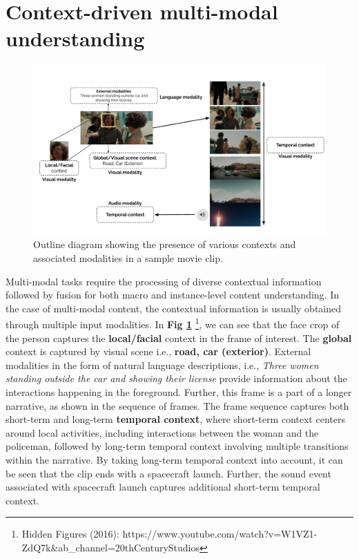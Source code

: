 \section{Context-driven multi-modal understanding}
\begin{figure}[h!]
    \centering
        \includegraphics[width=0.9\linewidth]{figures/context_diagram.pdf}
        \caption{Outline diagram showing the presence of various contexts and associated modalities in a sample movie clip.} 
        \label{contextmultimodal}
\end{figure}
Multi-modal tasks require the processing of diverse contextual information followed by fusion for both macro and instance-level content understanding. In the case of multi-modal content, the contextual information is usually obtained through multiple input modalities. In \textbf{Fig \ref{contextmultimodal}} \footnote{Hidden Figures (2016): https://www.youtube.com/watch?v=W1VZ1-ZdQ7k\&ab\_channel=20thCenturyStudios}, we can see that the face crop of the person captures the \textbf{local/facial} context in the frame of interest. The \textbf{global} context is captured by visual scene i.e., \textbf{road, car (exterior)}. External modalities in the form of natural language descriptions, i.e., \textit{Three women standing outside the car and showing their license} provide information about the interactions happening in the foreground. Further, this frame is a part of a longer narrative, as shown in the sequence of frames. The frame sequence captures both short-term and long-term \textbf{temporal context}, where short-term context centers around local activities, including interactions between the woman and the policeman, followed by long-term temporal context involving multiple transitions within the narrative. By taking long-term temporal context into account, it can be seen that the clip ends with a spacecraft launch. Further, the sound event associated with spacecraft launch captures additional short-term temporal context.
